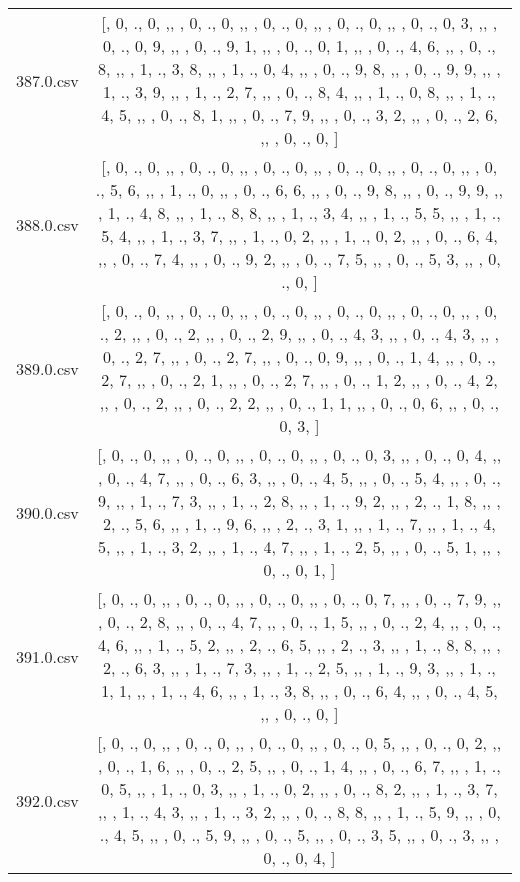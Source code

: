 \begin{table}[ht]
\begin{tabular}{@{}c c@{}}
	387.0.csv & [, 0, ., 0, ,,  , 0, ., 0, ,,  , 0, ., 0, ,,  , 0, ., 0, ,,  , 0, ., 0, 3, ,,  , 0, ., 0, 9, ,,  , 0, ., 9, 1, ,,  , 0, ., 0, 1, ,,  , 0, ., 4, 6, ,,  , 0, ., 8, ,,  , 1, ., 3, 8, ,,  , 1, ., 0, 4, ,,  , 0, ., 9, 8, ,,  , 0, ., 9, 9, ,,  , 1, ., 3, 9, ,,  , 1, ., 2, 7, ,,  , 0, ., 8, 4, ,,  , 1, ., 0, 8, ,,  , 1, ., 4, 5, ,,  , 0, ., 8, 1, ,,  , 0, ., 7, 9, ,,  , 0, ., 3, 2, ,,  , 0, ., 2, 6, ,,  , 0, ., 0, ]\\ 
	388.0.csv & [, 0, ., 0, ,,  , 0, ., 0, ,,  , 0, ., 0, ,,  , 0, ., 0, ,,  , 0, ., 0, ,,  , 0, ., 5, 6, ,,  , 1, ., 0, ,,  , 0, ., 6, 6, ,,  , 0, ., 9, 8, ,,  , 0, ., 9, 9, ,,  , 1, ., 4, 8, ,,  , 1, ., 8, 8, ,,  , 1, ., 3, 4, ,,  , 1, ., 5, 5, ,,  , 1, ., 5, 4, ,,  , 1, ., 3, 7, ,,  , 1, ., 0, 2, ,,  , 1, ., 0, 2, ,,  , 0, ., 6, 4, ,,  , 0, ., 7, 4, ,,  , 0, ., 9, 2, ,,  , 0, ., 7, 5, ,,  , 0, ., 5, 3, ,,  , 0, ., 0, ]\\ 
	389.0.csv & [, 0, ., 0, ,,  , 0, ., 0, ,,  , 0, ., 0, ,,  , 0, ., 0, ,,  , 0, ., 0, ,,  , 0, ., 2, ,,  , 0, ., 2, ,,  , 0, ., 2, 9, ,,  , 0, ., 4, 3, ,,  , 0, ., 4, 3, ,,  , 0, ., 2, 7, ,,  , 0, ., 2, 7, ,,  , 0, ., 0, 9, ,,  , 0, ., 1, 4, ,,  , 0, ., 2, 7, ,,  , 0, ., 2, 1, ,,  , 0, ., 2, 7, ,,  , 0, ., 1, 2, ,,  , 0, ., 4, 2, ,,  , 0, ., 2, ,,  , 0, ., 2, 2, ,,  , 0, ., 1, 1, ,,  , 0, ., 0, 6, ,,  , 0, ., 0, 3, ]\\ 
	390.0.csv & [, 0, ., 0, ,,  , 0, ., 0, ,,  , 0, ., 0, ,,  , 0, ., 0, 3, ,,  , 0, ., 0, 4, ,,  , 0, ., 4, 7, ,,  , 0, ., 6, 3, ,,  , 0, ., 4, 5, ,,  , 0, ., 5, 4, ,,  , 0, ., 9, ,,  , 1, ., 7, 3, ,,  , 1, ., 2, 8, ,,  , 1, ., 9, 2, ,,  , 2, ., 1, 8, ,,  , 2, ., 5, 6, ,,  , 1, ., 9, 6, ,,  , 2, ., 3, 1, ,,  , 1, ., 7, ,,  , 1, ., 4, 5, ,,  , 1, ., 3, 2, ,,  , 1, ., 4, 7, ,,  , 1, ., 2, 5, ,,  , 0, ., 5, 1, ,,  , 0, ., 0, 1, ]\\ 
	391.0.csv & [, 0, ., 0, ,,  , 0, ., 0, ,,  , 0, ., 0, ,,  , 0, ., 0, 7, ,,  , 0, ., 7, 9, ,,  , 0, ., 2, 8, ,,  , 0, ., 4, 7, ,,  , 0, ., 1, 5, ,,  , 0, ., 2, 4, ,,  , 0, ., 4, 6, ,,  , 1, ., 5, 2, ,,  , 2, ., 6, 5, ,,  , 2, ., 3, ,,  , 1, ., 8, 8, ,,  , 2, ., 6, 3, ,,  , 1, ., 7, 3, ,,  , 1, ., 2, 5, ,,  , 1, ., 9, 3, ,,  , 1, ., 1, 1, ,,  , 1, ., 4, 6, ,,  , 1, ., 3, 8, ,,  , 0, ., 6, 4, ,,  , 0, ., 4, 5, ,,  , 0, ., 0, ]\\ 
	392.0.csv & [, 0, ., 0, ,,  , 0, ., 0, ,,  , 0, ., 0, ,,  , 0, ., 0, 5, ,,  , 0, ., 0, 2, ,,  , 0, ., 1, 6, ,,  , 0, ., 2, 5, ,,  , 0, ., 1, 4, ,,  , 0, ., 6, 7, ,,  , 1, ., 0, 5, ,,  , 1, ., 0, 3, ,,  , 1, ., 0, 2, ,,  , 0, ., 8, 2, ,,  , 1, ., 3, 7, ,,  , 1, ., 4, 3, ,,  , 1, ., 3, 2, ,,  , 0, ., 8, 8, ,,  , 1, ., 5, 9, ,,  , 0, ., 4, 5, ,,  , 0, ., 5, 9, ,,  , 0, ., 5, ,,  , 0, ., 3, 5, ,,  , 0, ., 3, ,,  , 0, ., 0, 4, ]\\ 

\end{tabular}
\end{table}
